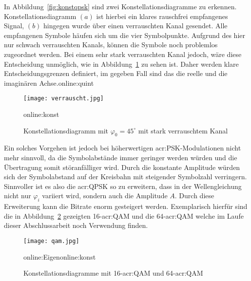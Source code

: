 In Abbildung~\ref{fig:konstqpsk} sind zwei Konstellationsdiagramme zu erkennen. Konstellationsdiagramm $(a)$ ist hierbei ein klares rauschfrei empfangenes Signal, $(b)$ hingegen wurde über einen verrauschten Kanal gesendet. Alle empfangenen Symbole häufen sich um die vier Symbolpunkte. Aufgrund des hier nur schwach verrauschten Kanals, können die Symbole noch problemlos zugeordnet werden. Bei einem sehr stark verrauschten Kanal jedoch, wäre diese Entscheidung unmöglich, wie in Abbildung~\ref{fig:verrauscht} zu sehen ist. Daher werden klare Entscheidungsgrenzen definiert, im gegeben Fall sind das die reelle und die imaginären Achse.\gls{online:quint}

\begin{figure}[H]
	\centering
	\texttt{[image: verrauscht.jpg]}
	\caption[Konstellationsdiagramm mit $\varphi_{0}=45^\circ$ mit stark verrauschtem Kanal]{Konstellationsdiagramm mit $\varphi_{0}=45^\circ$ mit stark verrauschtem Kanal} 
	\gls{online:konst}
	\label{fig:verrauscht}
\end{figure}

Ein solches Vorgehen ist jedoch bei höherwertigen \gls{acr:PSK}-Modulationen nicht mehr sinnvoll, da die Symbolabstände immer geringer werden würden und die Übertragung somit störanfälliger wird. Durch die konstante Amplitude würden sich der Symbolabstand auf der Kreisbahn mit steigender Symbolzahl verringern. Sinnvoller ist es also die \gls{acr:QPSK} so zu erweitern, dass in der Wellengleichung nicht nur $\varphi_{i}$ variiert wird, sondern auch die Amplitude $A$. Durch diese Erweiterung kann die Bitrate enorm gesteigert werden. Exemplarisch hierfür sind die in Abbildung~\ref{fig:qam} gezeigten 16-\gls{acr:QAM} und die 64-\gls{acr:QAM} welche im Laufe dieser Abschlussarbeit noch Verwendung finden.

\begin{figure}[H]
	\centering
	\texttt{[image: qam.jpg]}
	\caption[Konstellationsdiagramm 16-\gls{acr:QAM} und 64-\gls{acr:QAM}]{Konstellationsdiagramme mit  16-\gls{acr:QAM} und 64-\gls{acr:QAM}} 
	\gls{online:Eigen}\gls{online:konst}
	\label{fig:qam}
\end{figure}



